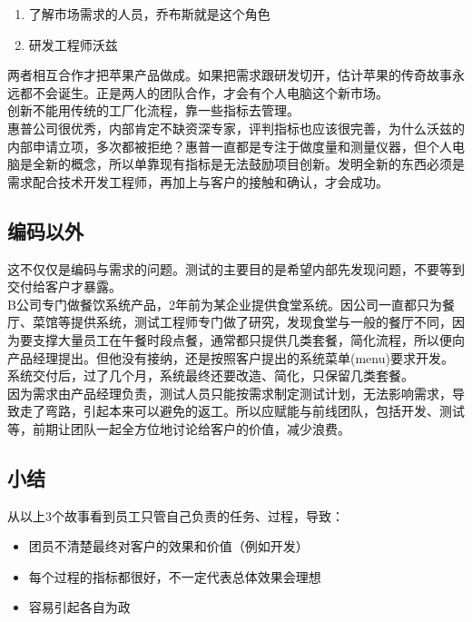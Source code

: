 \begin{enumerate}
\tightlist
\item
  了解市场需求的人员，乔布斯就是这个角色
\item
  研发工程师沃兹\\
\end{enumerate}

两者相互合作才把苹果产品做成。如果把需求跟研发切开，估计苹果的传奇故事永远都不会诞生。正是两人的团队合作，才会有个人电脑这个新市场。\\
创新不能用传统的工厂化流程，靠一些指标去管理。\\
惠普公司很优秀，内部肯定不缺资深专家，评判指标也应该很完善，为什么沃兹的内部申请立项，多次都被拒绝？惠普一直都是专注于做度量和测量仪器，但个人电脑是全新的概念，所以单靠现有指标是无法鼓励项目创新。发明全新的东西必须是需求配合技术开发工程师，再加上与客户的接触和确认，才会成功。\\

\hypertarget{ux7f16ux7801ux4ee5ux5916}{%
\subsection{编码以外}\label{ux7f16ux7801ux4ee5ux5916}}

这不仅仅是编码与需求的问题。测试的主要目的是希望内部先发现问题，不要等到交付给客户才暴露。\\
B公司专门做餐饮系统产品，2年前为某企业提供食堂系统。因公司一直都只为餐厅、菜馆等提供系统，测试工程师专门做了研究，发现食堂与一般的餐厅不同，因为要支撑大量员工在午餐时段点餐，通常都只提供几类套餐，简化流程，所以便向产品经理提出。但他没有接纳，还是按照客户提出的系统菜单(menu)要求开发。系统交付后，过了几个月，系统最终还要改造、简化，只保留几类套餐。\\
因为需求由产品经理负责，测试人员只能按需求制定测试计划，无法影响需求，导致走了弯路，引起本来可以避免的返工。所以应赋能与前线团队，包括开发、测试等，前期让团队一起全方位地讨论给客户的价值，减少浪费。

\hypertarget{ux5c0fux7ed3}{%
\subsection{小结}\label{ux5c0fux7ed3}}

从以上3个故事看到员工只管自己负责的任务、过程，导致：

\begin{itemize}
\tightlist
\item
  团员不清楚最终对客户的效果和价值（例如开发）
\item
  每个过程的指标都很好，不一定代表总体效果会理想
\item
  容易引起各自为政
\end{itemize}

